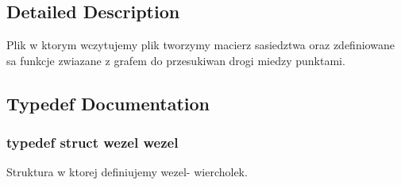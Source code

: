 \subsection{Detailed Description}
Plik w ktorym wczytujemy plik tworzymy macierz sasiedztwa oraz zdefiniowane sa funkcje zwiazane z grafem do przesukiwan drogi miedzy punktami. 

\subsection{Typedef Documentation}
\subsubsection[{wezel}]{\setlength{\rightskip}{0pt plus 5cm}typedef struct {\bf wezel} {\bf wezel}}\label{graf_8hh_a06892de85d4c8dd95535172286ff26e0}


Struktura w ktorej definiujemy wezel-\/ wiercholek. 

